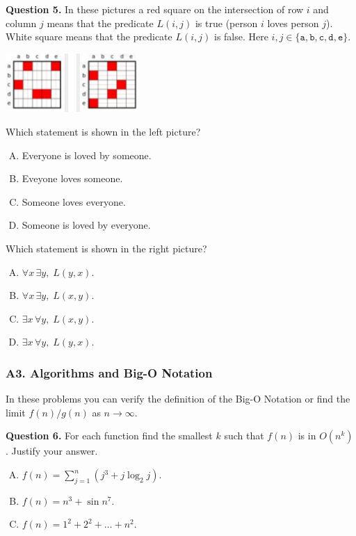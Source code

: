 \documentclass[jou]{apa6}
\begin{document}
\vspace{6pt}
{\bf Question 5.} 
In these pictures a red square on the intersection 
of row $i$ and column $j$ 
means that the predicate $L(i,j)$ is true (person $i$ 
loves person $j$). White square means that the predicate $L(i,j)$
is false. Here 
$i,j \in \{ \mathtt{a},\mathtt{b},\mathtt{c},\mathtt{d},\mathtt{e} \}$. 
\begin{center}
\includegraphics[width=2in]{midterm/predicate-grid.png}
\end{center}
Which statement is shown in the left picture?
\begin{enumerate}[(A)]
\item Everyone is loved by someone.
\item Eveyone loves someone.
\item Someone loves everyone.
\item Someone is loved by everyone.
\end{enumerate}
Which statement is shown in the right picture?
\begin{enumerate}[(A)]
\item $\forall x\, \exists y,\;L(y,x)$. 
\item $\forall x\, \exists y,\;L(x,y)$. 
\item $\exists x\, \forall y,\;L(x,y)$. 
\item $\exists x\, \forall y,\;L(y,x)$. 
\end{enumerate}




\subsubsection{A3. Algorithms and Big-O Notation}

In these problems you can verify the definition of the Big-O Notation 
or find the limit $f(n)/g(n)$ as $n \rightarrow \infty$. 

{\bf Question 6.} For each function find the smallest
$k$ such that $f(n)$ is in $O(n^k)$. Justify your answer.
\begin{enumerate}[(A)]
\item $f(n) = \sum_{j=1}^{n} (j^3 + j \log_2 j)$. 
\item $f(n) = n^3 + \sin n^7$. 
\item $f(n) = 1^2 + 2^2 + \ldots + n^2$.
\end{enumerate}
\end{document}
